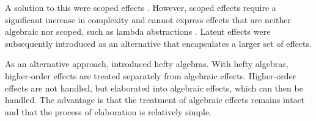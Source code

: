A solution to this were scoped effects \autocite{wu_effect_2014}. However, scoped effects require a significant increase in complexity and cannot express effects that are neither algebraic nor scoped, such as lambda abstractions \autocite{oh_latent_2021}. Latent effects \autocite{oh_latent_2021} were subsequently introduced as an alternative that encapsulates a larger set of effects.

As an alternative approach, \textcite{bach_poulsen_hefty_2023} introduced hefty algebras. With hefty algebras, higher-order effects are treated separately from algebraic effects. Higher-order effects are not handled, but elaborated into algebraic effects, which can then be handled. The advantage is that the treatment of algebraic effects remains intact and that the process of elaboration is relatively simple.

